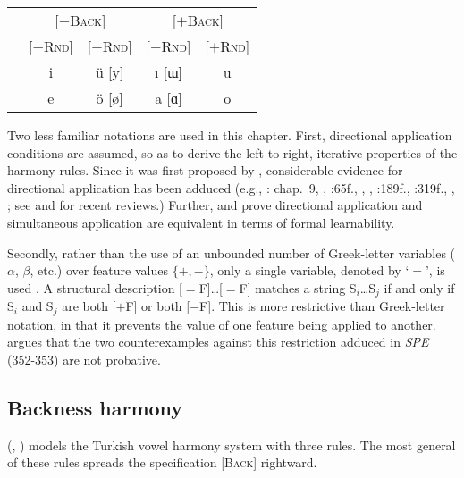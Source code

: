 \begin{example}
\begin{tabular}{c c c c c}
                       & \multicolumn{2}{c}{[$-$\textsc{Back}]} & \multicolumn{2}{c}{[$+$\textsc{Back}]} \\
                       & [$-$\textsc{Rnd}] & [$+$\textsc{Rnd}] & [$-$\textsc{Rnd}] & [$+$\textsc{Rnd}] \\ 
\cmidrule{2-5}
 & {i} & {ü} [y] & {ı} [ɯ] & {u} \\
 & {e} & {ö} [ø] & {a} [ɑ] & {o} \\
\end{tabular}
\end{example}

Two less familiar notations are used in this chapter. First, directional application conditions are assumed, so as to derive the left-to-right, iterative properties of the harmony rules. Since it was first proposed by \citet{Johnson1972}, considerable evidence for directional application has been adduced (e.g., \citealt{A74}: chap.~9, \citealt{Gorman2012e}, \citealt{Howard1972}:65f., \citealt{Kavitskaya2008}, \citealt{Kaye1982}, \citealt{KK77}:189f., \citeyear{KK79}:319f., \citealt{Piggott1975}, \citealt{Sohn1971}; see \citealt{McCarthy2003b} and \citealt{Wolf2011b} for recent reviews.) Further, \citet{Johnson1972} and \citet{Kaplan1994} prove directional application and simultaneous application are equivalent in terms of formal learnability.

Secondly, rather than the use of an unbounded number of Greek-letter variables ($\alpha$, $\beta$, etc.) over feature values $\{+, -\}$, only a single variable, denoted by `$=$', is used \citep{McCawley1973}. A structural description [$=$F]\ldots{}[$=$F] matches a string S$_i$\ldots{}S$_j$ if and only if S$_i$ and S$_j$ are both [$+$F] or both [$-$F]. This is more restrictive than Greek-letter notation, in that it prevents the value of one feature being applied to another. \citet{Odden2012} argues that the two counterexamples against this restriction adduced in \emph{SPE} (352-353) are not probative.

\subsection{Backness harmony}

\citeauthor{Lees1966b} (\citeyear[35]{Lees1966b}, \citeyear[284]{Lees1966a}) models the Turkish vowel harmony system with three rules. The most general of these rules spreads the specification [\textsc{Back}] rightward.

